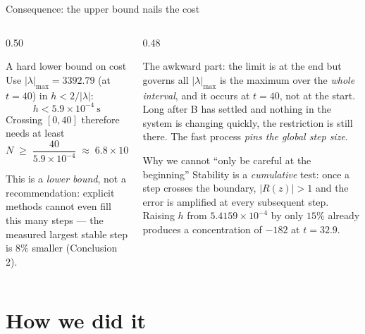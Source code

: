 \documentclass[aspectratio=169,10pt]{beamer}
\begin{document}
\begin{frame}{Consequence: the upper bound nails the cost}
  \begin{columns}[T]
    \begin{column}{0.50\textwidth}
      \begin{alertblock}{A hard lower bound on cost}
        Use $|\lambda|_{\max}=3392.79$ (at $t=40$) in $h<2/|\lambda|$:
        \[
          h < 5.9\times10^{-4}\ \mathrm{s}
        \]
        Crossing $[0,40]$ therefore needs at least
        \[
          N \;\ge\; \frac{40}{5.9\times10^{-4}} \;\approx\; 6.8\times10^{4}
        \]
      \end{alertblock}
      \footnotesize
      This is a \emph{lower bound}, not a recommendation: explicit methods
      cannot even fill this many steps --- the measured largest stable step is
      $8\%$ smaller (Conclusion 2).
    \end{column}
    \begin{column}{0.48\textwidth}
      \begin{block}{The awkward part: the limit is at the end but governs all}
        \footnotesize
        $|\lambda|_{\max}$ is the maximum over the \emph{whole interval}, and
        it occurs at $t=40$, not at the start.  Long after B has settled and
        nothing in the system is changing quickly, the restriction is
        \alert{still there}.  The fast process \emph{pins the global step size}.
      \end{block}
      \begin{block}{Why we cannot ``only be careful at the beginning''}
        \footnotesize
        Stability is a \emph{cumulative} test: once a step crosses the
        boundary, $|R(z)|>1$ and the error is amplified at every subsequent
        step.  Raising $h$ from $5.4159\times10^{-4}$ by only $15\%$ already
        produces a concentration of \alert{$-182$} at $t=32.9$.
      \end{block}
    \end{column}
  \end{columns}
\end{frame}

\section{How we did it}
\end{document}
